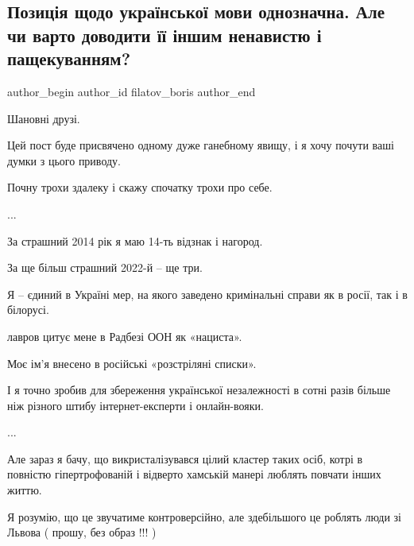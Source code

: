  
 
 
 
 

\subsection{Позиція щодо української мови однозначна.  Але чи варто доводити її іншим ненавистю і пащекуванням?}
\label{sec:17_01_2023.fb.filatov_boris.1.pozits_ya_shchodo_uk}

\ifcmt
 author_begin
   author_id filatov_boris
 author_end
\fi

Шановні друзі.

Цей пост буде присвячено одному дуже ганебному явищу, і я хочу почути ваші
думки з цього приводу. 

Почну трохи здалеку і скажу спочатку трохи про себе.

...

За страшний 2014 рік я маю 14-ть відзнак і нагород. 

За ще більш страшний 2022-й – ще три.

Я – єдиний в Україні мер, на якого заведено кримінальні справи як в росії, так
і в білорусі.

лавров цитує мене в Радбезі ООН як «нациста». 

Моє ім'я внесено в російські «розстріляні списки». 

І я точно зробив для збереження української незалежності в сотні разів більше
ніж різного штибу інтернет-експерти і онлайн-вояки.

...

Але зараз я бачу, що викристалізувався цілий кластер таких осіб, котрі в
повністю гіпертрофованій і відверто хамській манері люблять повчати інших
життю. 

Я розумію, що це звучатиме контроверсійно, але здебільшого це роблять люди зі
Львова ( прошу, без образ !!! )

